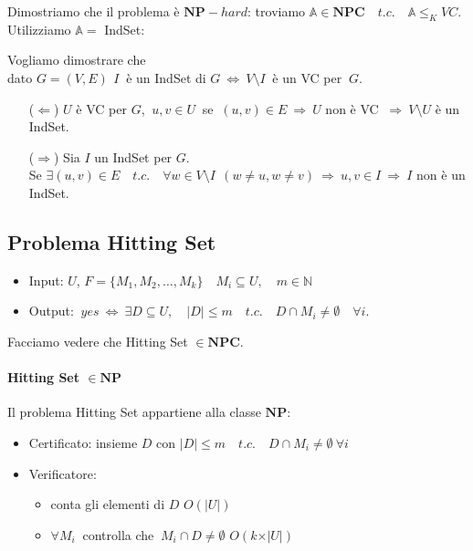 \documentclass[a4paper]{article}
\theoremstyle{definition}
\newcommand{\N}{\mathbb{N}}
\newcommand{\np}{\mathbf{NP}}
\newcommand{\npc}{\mathbf{NPC}}
\newcommand{\prob}[1]{\mathbb{#1}}
\begin{document}
		
		Dimostriamo che il problema è $ \np-hard $: troviamo $ \prob{A}\in \npc\quad t.c.\quad \prob{A}\leq_K VC $.\\
		
		Utilizziamo $ \prob{A} = $ IndSet:
		
		Vogliamo dimostrare che\\ 
		dato $ G = (V, E)\,\ I\ $ è un IndSet di $ G\ \Leftrightarrow \ V\setminus I\ $ è un VC per $ \ G $. 
		\begin{itemize}
			\item[($ \Leftarrow $)] $ U $ è VC per $ G $, $ \ u, v \in U \ $ se $ \ (u,v)\in E\ \Rightarrow\ U $ non è VC
			$ \ \Rightarrow\ V\setminus U $ è un IndSet.
			\item[($ \Rightarrow $)] Sia $ I $ un IndSet per $ G $.\\
			Se $ \exists (u,v)\in E\quad t.c.\quad \forall w \in V\setminus I\ \ (w\neq u, w\neq v)\ \Rightarrow\ u, v\in I\ \Rightarrow\ I $ non è un IndSet.
		\end{itemize}
	
	\subsection{Problema Hitting Set}
		\begin{itemize}
			\item Input: $ U $, $ F = \{M_1, M_2, \dots, M_k\}\quad M_i\subseteq U,\quad m \in\N $
			\item Output: $ \ yes\ \Leftrightarrow\ \exists D\subseteq U, \quad \vert D\vert \leq m\quad t.c.\quad D\cap M_i \neq \emptyset\quad \forall i $.
		\end{itemize}
		Facciamo vedere che Hitting Set $ \in \npc $.
	
		\paragraph{Hitting Set $ \in \np $} Il problema Hitting Set appartiene alla classe $ \np $:
		\begin{itemize}
			\item Certificato: insieme $ D $ con $ \vert D \vert \leq m\quad t.c.\quad D\cap M_i \neq \emptyset\ \forall i $
			\item Verificatore: 
			\begin{itemize}
				\item conta gli elementi di $ D $ \hspace{2cm} $ O(\vert U \vert) $
				\item $ \forall M_i\  $ controlla che $ \ M_i\cap D \neq \emptyset $ \hspace{.7cm} $ O(k\times\vert U \vert) $
			\end{itemize}		
		\end{itemize}
		
\end{document}
